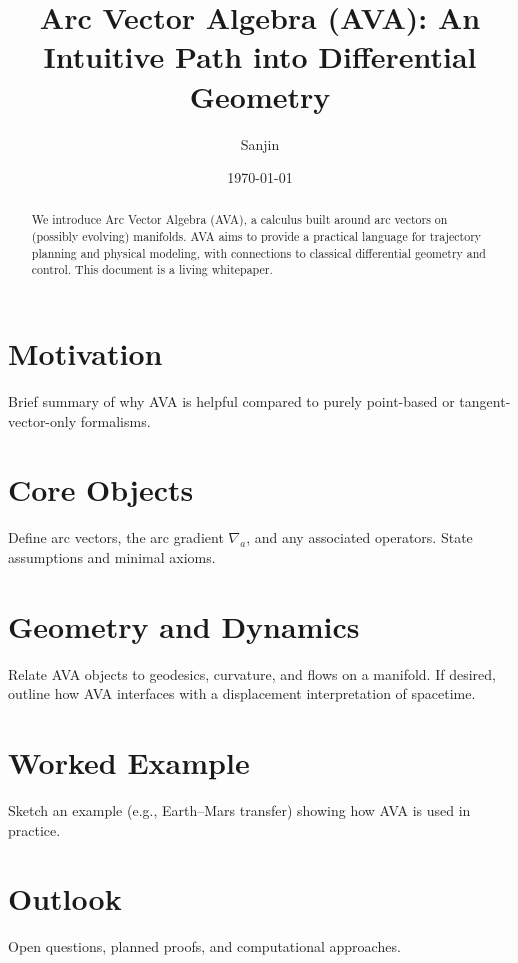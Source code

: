 \documentclass[11pt,a4paper]{article}
\title{Arc Vector Algebra (AVA): An Intuitive Path into Differential Geometry}
\author{Sanjin}
\date{\today}
\begin{document}
\maketitle

\begin{abstract}
We introduce Arc Vector Algebra (AVA), a calculus built around arc vectors on (possibly evolving) manifolds.
AVA aims to provide a practical language for trajectory planning and physical modeling, with connections to
classical differential geometry and control. This document is a living whitepaper.
\end{abstract}

\section{Motivation}
Brief summary of why AVA is helpful compared to purely point-based or tangent-vector-only formalisms.

\section{Core Objects}
Define arc vectors, the arc gradient $\nabla_a$, and any associated operators.
State assumptions and minimal axioms.

\section{Geometry and Dynamics}
Relate AVA objects to geodesics, curvature, and flows on a manifold.
If desired, outline how AVA interfaces with a displacement interpretation of spacetime.

\section{Worked Example}
Sketch an example (e.g., Earth--Mars transfer) showing how AVA is used in practice.

\section{Outlook}
Open questions, planned proofs, and computational approaches.



\end{document}
